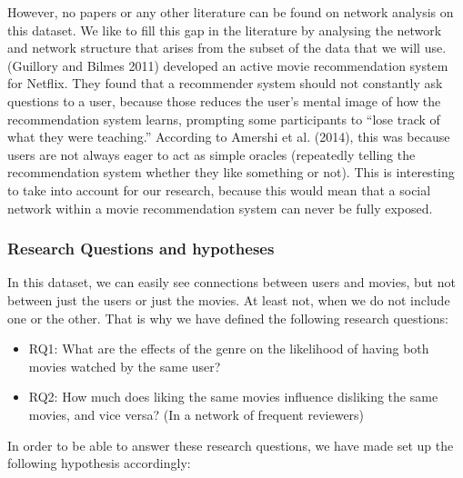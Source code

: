 \documentclass[
  man]{apa6}
\providecommand{\tightlist}{%
  \setlength{\itemsep}{0pt}\setlength{\parskip}{0pt}}
\begin{document}
However, no papers or any other literature can be found on network
analysis on this dataset. We like to fill this gap in the literature by
analysing the network and network structure that arises from the subset
of the data that we will use. (Guillory and Bilmes 2011) developed an
active movie recommendation system for Netflix. They found that a
recommender system should not constantly ask questions to a user,
because those reduces the user's mental image of how the recommendation
system learns, prompting some participants to ``lose track of what they
were teaching.'' According to Amershi et al. (2014), this was because
users are not always eager to act as simple oracles (repeatedly telling
the recommendation system whether they like something or not). This is
interesting to take into account for our research, because this would
mean that a social network within a movie recommendation system can
never be fully exposed.

\hypertarget{research-questions-and-hypotheses}{%
\subsubsection{Research Questions and
hypotheses}\label{research-questions-and-hypotheses}}

In this dataset, we can easily see connections between users and movies,
but not between just the users or just the movies. At least not, when we
do not include one or the other. That is why we have defined the
following research questions:

\begin{itemize}
\tightlist
\item
  RQ1: What are the effects of the genre on the likelihood of having
  both movies watched by the same user?
\item
  RQ2: How much does liking the same movies influence disliking the same
  movies, and vice versa? (In a network of frequent reviewers)
\end{itemize}

In order to be able to answer these research questions, we have made set
up the following hypothesis accordingly:
\end{document}
